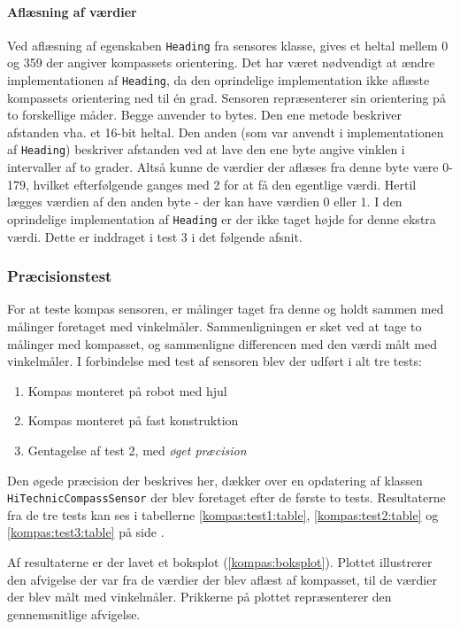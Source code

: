 \paragraph{Aflæsning af værdier}\label{kompas:reading}
Ved aflæsning af egenskaben \lstinline[style=csharp]!Heading! fra sensores klasse, gives et heltal mellem 0 og 359 der angiver kompassets orientering.
Det har været nødvendigt at ændre implementationen af \lstinline[style=csharp]!Heading!, da den oprindelige implementation ikke aflæste kompassets orientering ned til \'en grad.
Sensoren repræsenterer sin orientering på to forskellige måder.
Begge anvender to bytes.
Den ene metode beskriver afstanden vha. et 16-bit heltal.
Den anden (som var anvendt i implementationen af \lstinline[style=csharp]!Heading!) beskriver afstanden ved at lave den ene byte angive vinklen i intervaller af to grader.
Altså kunne de værdier der aflæses fra denne byte være 0-179, hvilket efterfølgende ganges med 2 for at få den egentlige værdi.
Hertil lægges værdien af den anden byte - der kan have værdien 0 eller 1.
I den oprindelige implementation af \lstinline[style=csharp]!Heading! er der ikke taget højde for denne ekstra værdi.
Dette er inddraget i test 3 i det følgende afsnit.

\subsubsection{Præcisionstest}\label{kompas:precision}
For at teste kompas sensoren, er målinger taget fra denne og holdt sammen med målinger foretaget med vinkelmåler.
Sammenligningen er sket ved at tage to målinger med kompasset, og sammenligne differencen med den værdi målt med vinkelmåler.
I forbindelse med test af sensoren blev der udført i alt tre tests:
\begin{enumerate}
\item Kompas monteret på robot med hjul
\item Kompas monteret på fast konstruktion
\item Gentagelse af test 2, med \textit{øget præcision}
\end{enumerate}
Den øgede præcision der beskrives her, dækker over en opdatering af \mindsqualls klassen \lstinline[style=csharp]!HiTechnicCompassSensor! der blev foretaget efter de første to tests.
Resultaterne fra de tre tests kan ses i tabellerne \ref{kompas:test1:table}, \ref{kompas:test2:table} og \ref{kompas:test3:table} på side \pageref{kompas:test1:table}.

Af resultaterne er der lavet et boksplot (\cref{kompas:boksplot}).
Plottet illustrerer den afvigelse der var fra de værdier der blev aflæst af kompasset, til de værdier der blev målt med vinkelmåler.
Prikkerne på plottet repræsenterer den gennemsnitlige afvigelse.

